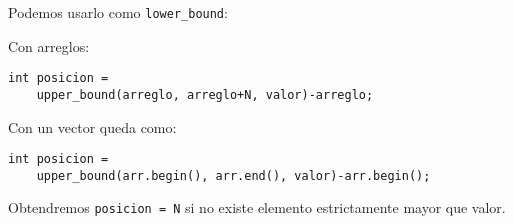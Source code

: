 Podemos usarlo como \verb|lower_bound|:

Con arreglos:

\begin{small}
\begin{lstlisting}
int posicion = 
	upper_bound(arreglo, arreglo+N, valor)-arreglo;
\end{lstlisting}
\end{small}

Con un vector queda como:

\begin{small}
\begin{lstlisting}
int posicion = 
	upper_bound(arr.begin(), arr.end(), valor)-arr.begin();
\end{lstlisting}
\end{small}

Obtendremos \verb|posicion = N| si no existe elemento estrictamente mayor que valor.

